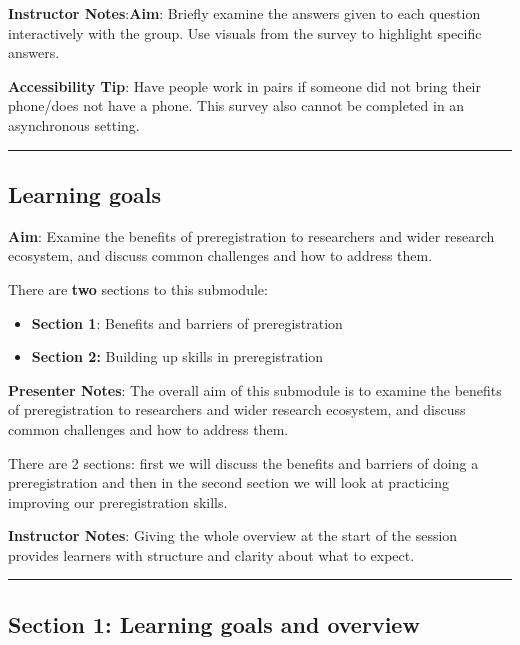 \documentclass[
  letterpaper,
  DIV=11,
  numbers=noendperiod]{scrartcl}
\begin{document}
\textbf{Instructor Notes}:\textbf{Aim}: Briefly examine the answers
given to each question interactively with the group. Use visuals from
the survey to highlight specific answers.

\textbf{Accessibility Tip}: Have people work in pairs if someone did not
bring their phone/does not have a phone. This survey also cannot be
completed in an asynchronous setting.

\begin{center}\rule{0.5\linewidth}{0.5pt}\end{center}

\subsection{Learning goals}\label{learning-goals}

\textbf{Aim}: Examine the benefits of preregistration to researchers and
wider research ecosystem, and discuss common challenges and how to
address them.

There are \textbf{two} sections to this submodule:

\begin{itemize}
\item
  \textbf{Section 1}: Benefits and barriers of preregistration
\item
  \textbf{Section 2:} Building up skills in preregistration
\end{itemize}

\textbf{Presenter Notes}: The overall aim of this submodule is to
examine the benefits of preregistration to researchers and wider
research ecosystem, and discuss common challenges and how to address
them.

There are 2 sections: first we will discuss the benefits and barriers of
doing a preregistration and then in the second section we will look at
practicing improving our preregistration skills.

\textbf{Instructor Notes}: Giving the whole overview at the start of the
session provides learners with structure and clarity about what to
expect.

\begin{center}\rule{0.5\linewidth}{0.5pt}\end{center}

\subsection{Section 1: Learning goals and
overview}\label{section-1-learning-goals-and-overview}
\end{document}
